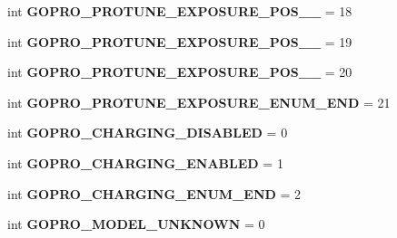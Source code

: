 \begin{DoxyCompactItemize}
int {\bfseries G\+O\+P\+R\+O\+\_\+\+P\+R\+O\+T\+U\+N\+E\+\_\+\+E\+X\+P\+O\+S\+U\+R\+E\+\_\+\+P\+O\+S\+\_\+\_} = 18
\item 
\mbox{\label{namespacepymavlink_1_1dialects_1_1v10_afa1f475078c8b02ade6a7fd8d9097591}} 
int {\bfseries G\+O\+P\+R\+O\+\_\+\+P\+R\+O\+T\+U\+N\+E\+\_\+\+E\+X\+P\+O\+S\+U\+R\+E\+\_\+\+P\+O\+S\+\_\+\_} = 19
\item 
\mbox{\label{namespacepymavlink_1_1dialects_1_1v10_ab50eed556b3dd136aa98efa4b554e603}} 
int {\bfseries G\+O\+P\+R\+O\+\_\+\+P\+R\+O\+T\+U\+N\+E\+\_\+\+E\+X\+P\+O\+S\+U\+R\+E\+\_\+\+P\+O\+S\+\_\+\_} = 20
\item 
\mbox{\label{namespacepymavlink_1_1dialects_1_1v10_a5a2a8b5dc080f1fc55b8fe8165713aeb}} 
int {\bfseries G\+O\+P\+R\+O\+\_\+\+P\+R\+O\+T\+U\+N\+E\+\_\+\+E\+X\+P\+O\+S\+U\+R\+E\+\_\+\+E\+N\+U\+M\+\_\+\+E\+ND} = 21
\item 
\mbox{\label{namespacepymavlink_1_1dialects_1_1v10_a67de4ca2c8706d1c0c7e4b1ac0350c56}} 
int {\bfseries G\+O\+P\+R\+O\+\_\+\+C\+H\+A\+R\+G\+I\+N\+G\+\_\+\+D\+I\+S\+A\+B\+L\+ED} = 0
\item 
\mbox{\label{namespacepymavlink_1_1dialects_1_1v10_a9fd52b2616963eb1d1b8ec410f36484a}} 
int {\bfseries G\+O\+P\+R\+O\+\_\+\+C\+H\+A\+R\+G\+I\+N\+G\+\_\+\+E\+N\+A\+B\+L\+ED} = 1
\item 
\mbox{\label{namespacepymavlink_1_1dialects_1_1v10_a294ab3e2202b86720c823861c0352127}} 
int {\bfseries G\+O\+P\+R\+O\+\_\+\+C\+H\+A\+R\+G\+I\+N\+G\+\_\+\+E\+N\+U\+M\+\_\+\+E\+ND} = 2
\item 
\mbox{\label{namespacepymavlink_1_1dialects_1_1v10_a6858441bc86d64e48f71e8a429599de3}} 
int {\bfseries G\+O\+P\+R\+O\+\_\+\+M\+O\+D\+E\+L\+\_\+\+U\+N\+K\+N\+O\+WN} = 0
\item 
\mbox{\label{namespacepymavlink_1_1dialects_1_1v10_a31b7f6beed43e00442dbd6add0092020}} 

\end{DoxyCompactItemize}
